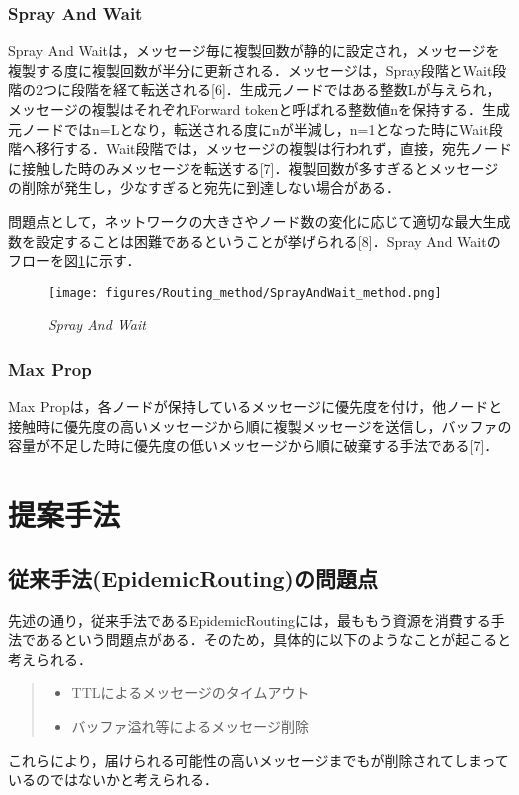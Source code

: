 \documentclass[11pt]{icsthesis}
\begin{document}
\subsection{Spray And Wait}
Spray And Waitは，メッセージ毎に複製回数が静的に設定され，メッセージを複製する度に複製回数が半分に更新される．メッセージは，Spray段階とWait段階の2つに段階を経て転送される[6]．生成元ノードではある整数Lが与えられ，メッセージの複製はそれぞれForward tokenと呼ばれる整数値nを保持する．生成元ノードではn=Lとなり，転送される度にnが半減し，n=1となった時にWait段階へ移行する．Wait段階では，メッセージの複製は行われず，直接，宛先ノードに接触した時のみメッセージを転送する[7]．複製回数が多すぎるとメッセージの削除が発生し，少なすぎると宛先に到達しない場合がある．

問題点として，ネットワークの大きさやノード数の変化に応じて適切な最大生成数を設定することは困難であるということが挙げられる[8]．Spray And Waitのフローを図\ref{SprayAndWait}に示す．

\begin{figure}[h]
	\centering
	\texttt{[image: figures/Routing\_method/SprayAndWait\_method.png]}
	\caption[]{\it{Spray And Wait}}
	\label{SprayAndWait}
\end{figure}

\subsection{Max Prop}
Max Propは，各ノードが保持しているメッセージに優先度を付け，他ノードと接触時に優先度の高いメッセージから順に複製メッセージを送信し，バッファの容量が不足した時に優先度の低いメッセージから順に破棄する手法である[7]．

\chapter{提案手法}
\section{従来手法(EpidemicRouting)の問題点}
先述の通り，従来手法であるEpidemicRoutingには，最ももう資源を消費する手法であるという問題点がある．そのため，具体的に以下のようなことが起こると考えられる．
\begin{quote}
\begin{itemize}
\item TTLによるメッセージのタイムアウト
\item バッファ溢れ等によるメッセージ削除
\end{itemize}
\end{quote}
これらにより，届けられる可能性の高いメッセージまでもが削除されてしまっているのではないかと考えられる．
\end{document}
